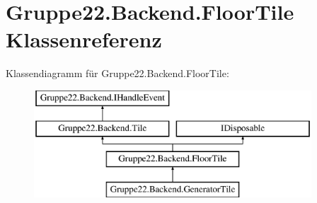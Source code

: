 \hypertarget{class_gruppe22_1_1_backend_1_1_floor_tile}{\section{Gruppe22.\-Backend.\-Floor\-Tile Klassenreferenz}
\label{class_gruppe22_1_1_backend_1_1_floor_tile}
}
Klassendiagramm für Gruppe22.\-Backend.\-Floor\-Tile\-:\begin{figure}[H]
\begin{center}
\leavevmode
\includegraphics[height=4.000000cm]{class_gruppe22_1_1_backend_1_1_floor_tile}
\end{center}
\end{figure}
